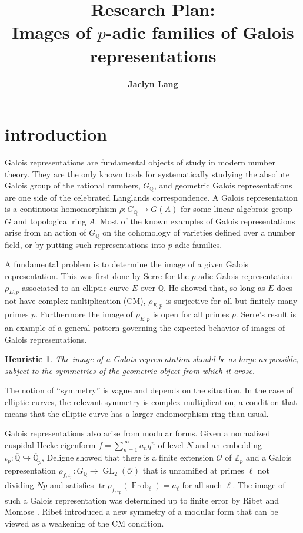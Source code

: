 \documentclass[11pt]{amsart}
\title{Research Plan: \\  {Images of \MakeLowercase{$p$}-adic families of Galois representations}}
\author{\textbf{Jaclyn Lang}}
\newtheorem*{heuristic}{Heuristic}
\theoremstyle{definition}
\theoremstyle{remark}
\DeclareMathOperator{\Frob}{Frob}
\DeclareMathOperator{\tr}{tr}
\def\OK{\mathcal{O}}
\def\Q{\mathbb{Q}}
\def\Z{\mathbb{Z}}
\DeclareMathOperator{\GL}{GL}
\begin{document}
\maketitle
\section*{introduction}
Galois representations are fundamental objects of study in modern number theory.  They are the only known tools for systematically studying the absolute Galois group of the rational numbers, $G_\Q$, and geometric Galois representations are one side of the celebrated Langlands correspondence.  A Galois representation is a continuous homomorphism $\rho : G_\Q \to G(A)$ for some linear algebraic group  $G$ and topological ring $A$.  Most of the known examples of Galois representations arise from an action of $G_\Q$ on the cohomology of varieties defined over a number field, or by putting such representations into $p$-adic families.  

A fundamental problem is to determine the image of a given Galois representation.  This was first done by Serre \cite{Serre68} for the $p$-adic Galois representation $\rho_{E, p}$ associated to an elliptic curve $E$ over $\Q$.  He showed that, so long as $E$ does not have complex multiplication (CM), $\rho_{E, p}$ is surjective for all but finitely many primes $p$.  Furthermore the image of $\rho_{E, p}$ is open for all primes $p$.  Serre's result is an example of a general pattern governing the expected behavior of images of Galois representations.

\begin{heuristic}
The image of a Galois representation should be as large as possible, subject to the symmetries of the geometric object from which it arose.
\end{heuristic}

The notion of ``symmetry'' is vague and depends on the situation.  In the case of elliptic curves, the relevant symmetry is complex multiplication, a condition that means that the elliptic curve has a larger endomorphism ring than usual.  

Galois representations also arise from modular forms.  Given a normalized cuspidal Hecke eigenform $f = \sum_{n = 1}^\infty a_nq^n$ of level $N$ and an embedding $\iota_p : \overline{\Q} \hookrightarrow \overline{\Q}_p$, Deligne \cite{Deligne71} showed that there is a finite extension $\OK$ of $\Z_p$ and a Galois representation $\rho_{f, \iota_p} : G_\Q \to \GL_2(\OK)$ that is unramified at primes $\ell$ not dividing $Np$ and satisfies $\tr \rho_{f, \iota_p}(\Frob_\ell) = a_\ell$ for all such $\ell$.  The image of such a Galois representation was determined up to finite error by Ribet and Momose \cite{Momose81, Ribet83}.  Ribet introduced a new symmetry of a modular form that can be viewed as a weakening of the CM condition.
\end{document}
